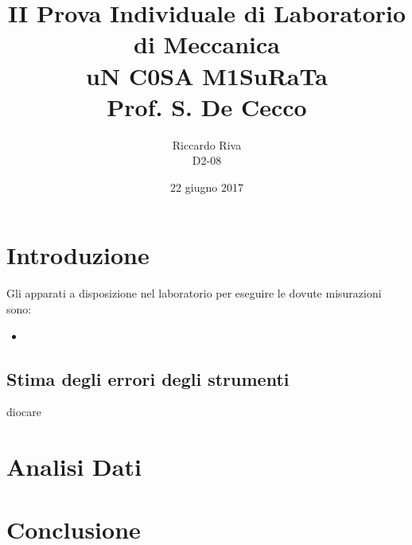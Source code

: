 \documentclass[11pt,a4paper,openright]{article}
\begin{document}
\title{\textbf{II Prova Individuale di Laboratorio di Meccanica} \\ uN C0SA M1SuRaTa\\\small{Prof. S. De Cecco}}
\author{Riccardo Riva\\D2-08}
\date{22 giugno 2017}

\maketitle
 \newpage
\section{Introduzione}
Gli apparati a disposizione nel laboratorio per eseguire le dovute misurazioni sono:
\begin{itemize}
\item
\end{itemize}

\subsection{Stima degli errori degli strumenti}
diocare

\section{Analisi Dati}

\section{Conclusione}
\end{document}
